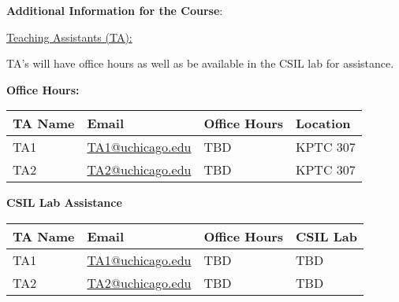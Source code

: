 \noindent \textbf {\Large \sc Additional Information for the Course}:

\vspace{1cm}

\noindent \underline{Teaching Assistants (TA):}

\noindent TA's will have office hours as well as be available in the CSIL lab for assistance.

\textbf{Office Hours:}

\begin{tabular}{l l | l | l }

TA Name & Email & Office Hours & Location \\ \hline

TA1 & \href{mailto:TA1}{TA1@uchicago.edu} & TBD  & KPTC 307 \\
TA2 & \href{mailto:TA2}{TA2@uchicago.edu} & TBD  & KPTC 307 \\


\end{tabular}

\vspace{1cm}

\textbf{CSIL Lab Assistance}

\begin{tabular}{l l | l | l }

TA Name & Email & Office Hours & CSIL Lab \\ \hline

TA1 & \href{mailto:TA1}{TA1@uchicago.edu} & TBD  & TBD \\
TA2 & \href{mailto:TA2}{TA2@uchicago.edu} & TBD  & TBD \\


\end{tabular}

\vspace{1cm}

